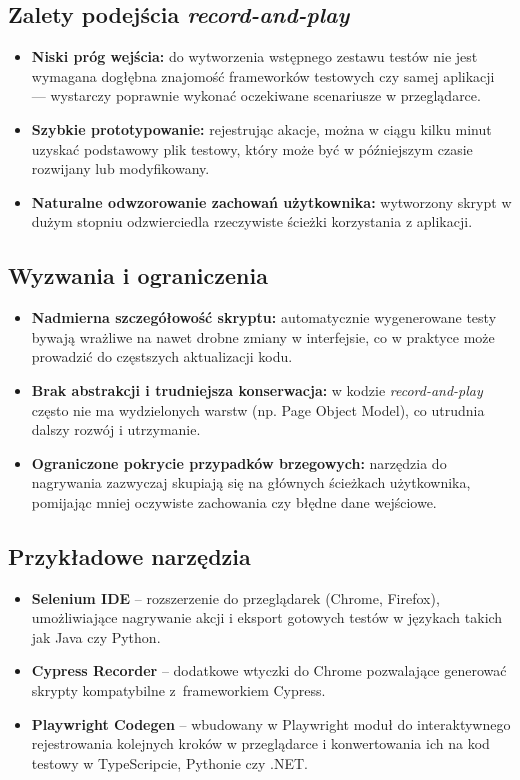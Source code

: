 \documentclass[12pt]{report}
\begin{document}
\subsection*{Zalety podejścia \emph{record-and-play}}
\begin{itemize}
    \item \textbf{Niski próg wejścia:} do wytworzenia wstępnego zestawu testów nie jest wymagana dogłębna znajomość frameworków testowych czy samej aplikacji — wystarczy poprawnie wykonać oczekiwane scenariusze w przeglądarce.
    \item \textbf{Szybkie prototypowanie:} rejestrując akacje, można w ciągu kilku minut uzyskać podstawowy plik testowy, który może być w późniejszym czasie rozwijany lub modyfikowany.
    \item \textbf{Naturalne odwzorowanie zachowań użytkownika:} wytworzony skrypt w dużym stopniu odzwierciedla rzeczywiste ścieżki korzystania z aplikacji.
\end{itemize}

\subsection*{Wyzwania i ograniczenia}
\begin{itemize}
    \item \textbf{Nadmierna szczegółowość skryptu:} automatycznie wygenerowane testy bywają wrażliwe na nawet drobne zmiany w interfejsie, co w praktyce może prowadzić do częstszych aktualizacji kodu.
    \item \textbf{Brak abstrakcji i trudniejsza konserwacja:} w kodzie \emph{record-and-play} często nie ma wydzielonych warstw (np. Page Object Model), co utrudnia dalszy rozwój i utrzymanie.
    \item \textbf{Ograniczone pokrycie przypadków brzegowych:} narzędzia do nagrywania zazwyczaj skupiają się na głównych ścieżkach użytkownika, pomijając mniej oczywiste zachowania czy błędne dane wejściowe.
\end{itemize}

\subsection*{Przykładowe narzędzia}
\begin{itemize}
    \item \textbf{Selenium IDE} – rozszerzenie do przeglądarek (Chrome, Firefox), umożliwiające nagrywanie akcji i eksport gotowych testów w językach takich jak Java czy Python.
    \item \textbf{Cypress Recorder} – dodatkowe wtyczki do Chrome pozwalające generować skrypty kompatybilne z~frameworkiem Cypress.
    \item \textbf{Playwright Codegen} – wbudowany w Playwright moduł do interaktywnego rejestrowania kolejnych kroków w przeglądarce i konwertowania ich na kod testowy w TypeScripcie, Pythonie czy .NET.
\end{itemize}
\end{document}
